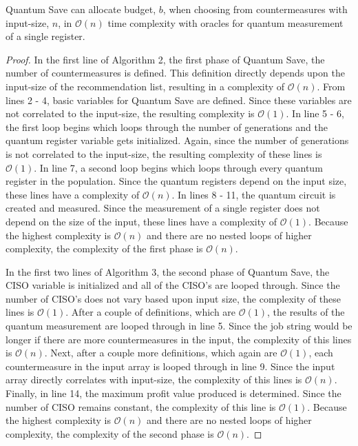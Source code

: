 \begin{lemma}
Quantum Save can allocate budget, $b$, when choosing from countermeasures with input-size, $n$, in $\mathcal{O}(n)$ time complexity with oracles for quantum measurement of a single register.
\end{lemma}

\begin{proof}
In the first line of Algorithm 2, the first phase of Quantum Save, the number of countermeasures is defined. This definition directly depends upon the input-size of the recommendation list, resulting in a complexity of $\mathcal{O}(n)$. From lines 2 - 4, basic variables for Quantum Save are defined. Since these variables are not correlated to the input-size, the resulting complexity is $\mathcal{O}(1)$. In line 5 - 6, the first loop begins which loops through the number of generations and the quantum register variable gets initialized. Again, since the number of generations is not correlated to the input-size, the resulting complexity of these lines is $\mathcal{O}(1)$. In line 7, a second loop begins which loops through every quantum register in the population. Since the quantum registers depend on the input size, these lines have a complexity of $\mathcal{O}(n)$. In lines 8 - 11, the quantum circuit is created and measured. Since the measurement of a single register does not depend on the size of the input, these lines have a complexity of $\mathcal{O}(1)$. Because the highest complexity is $\mathcal{O}(n)$ and there are no nested loops of higher complexity, the complexity of the first phase is $\mathcal{O}(n)$.

\vspace{1mm}

In the first two lines of Algorithm 3, the second phase of Quantum Save, the CISO variable is initialized and all of the CISO's are looped through. Since the number of CISO's does not vary based upon input size, the complexity of these lines is $\mathcal{O}(1)$. After a couple of definitions, which are $\mathcal{O}(1)$, the results of the quantum measurement are looped through in line 5. Since the job string would be longer if there are more countermeasures in the input, the complexity of this lines is $\mathcal{O}(n)$. Next, after a couple more definitions, which again are $\mathcal{O}(1)$, each countermeasure in the input array is looped through in line 9. Since the input array directly correlates with input-size, the complexity of this lines is $\mathcal{O}(n)$. Finally, in line 14, the maximum profit value produced is determined. Since the number of CISO remains constant, the complexity of this line is $\mathcal{O}(1)$. Because the highest complexity is $\mathcal{O}(n)$ and there are no nested loops of higher complexity, the complexity of the second phase is $\mathcal{O}(n)$.


\end{proof}
